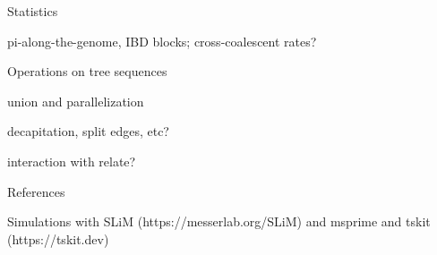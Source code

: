 \documentclass[landscape,a0paper,fontscale=0.292]{baposter}
\begin{document}
\begin{poster}
\begin{posterbox}[name=vizex,below=viz,column=2,row=0,span=1]{}
\end{posterbox}



\begin{posterbox}[name=stats,column=3,row=0,span=1]{Statistics}

pi-along-the-genome, IBD blocks; cross-coalescent rates?

\end{posterbox}


\begin{posterbox}[name=operations,column=3,below=stats,span=1]{Operations on tree sequences}

union and parallelization

decapitation, split edges, etc?

interaction with relate?


\end{posterbox}



\begin{posterbox}[name=refs,column=3,above=bottom]{References}
  \renewcommand{\section}[2]{\vskip 0.0em}
  
  \setlength{\bibsep}{0.0pt}

    Simulations with SLiM (https://messerlab.org/SLiM)
    and msprime
    and tskit (https://tskit.dev)

  
\end{posterbox}


\end{poster}%
\end{document}
